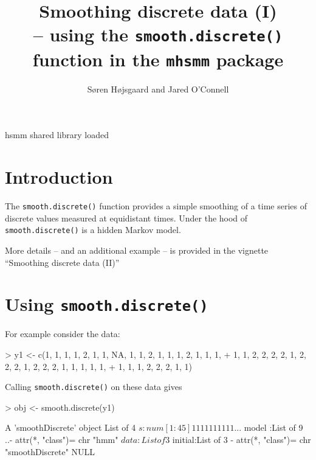 \documentclass{article}
\title{Smoothing discrete data (I)\\ -- using the \texttt{smooth.discrete()} function in the
  \texttt{mhsmm} package}
\author{S{\o}ren H{\o}jsgaard and Jared O'Connell}
\begin{document}
 
\renewenvironment{Schunk}{\linespread{.85}\small}{}

\maketitle

\parindent0pt\parskip5pt

\tableofcontents

\begin{Schunk}
\begin{Soutput}
hsmm shared library loaded
\end{Soutput}
\end{Schunk}


\section{Introduction}


The \verb'smooth.discrete()' function provides a simple smoothing of a
time series of discrete values measured at equidistant times.
Under the hood of  \verb'smooth.discrete()' is a hidden Markov model.

More details -- and an additional example -- is provided in the
vignette ``Smoothing discrete data (II)''

\section{Using \texttt{smooth.discrete()}}

For example consider the data:
\begin{Schunk}
\begin{Sinput}
> y1 <- c(1, 1, 1, 1, 2, 1, 1, NA, 1, 1, 2, 1, 1, 1, 2, 1, 1, 1, 
+     1, 1, 2, 2, 2, 2, 1, 2, 2, 2, 1, 2, 2, 2, 1, 1, 1, 1, 1, 
+     1, 1, 1, 2, 2, 2, 1, 1)
\end{Sinput}
\end{Schunk}

Calling \verb'smooth.discrete()' on these data gives 
\begin{Schunk}
\begin{Sinput}
> obj <- smooth.discrete(y1)
\end{Sinput}
\begin{Soutput}
A 'smoothDiscrete' object
List of 4
 $ s      : num [1:45] 1 1 1 1 1 1 1 1 1 1 ...
 $ model  :List of 9
  ..- attr(*, "class")= chr "hmm"
 $ data   :List of 3
 $ initial:List of 3
 - attr(*, "class")= chr "smoothDiscrete"
NULL
\end{Soutput}
\end{Schunk}
\end{document}
